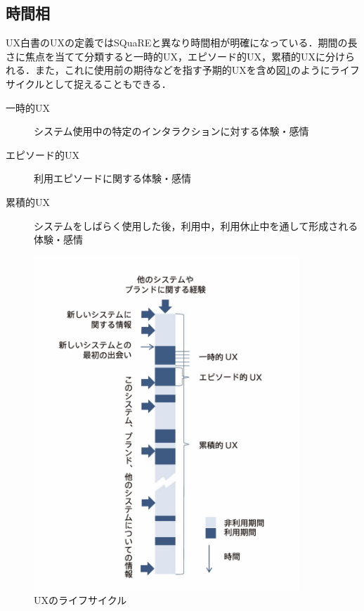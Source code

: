 \subsection{時間相}

UX白書のUXの定義ではSQuaREと異なり時間相が明確になっている．期間の長さに焦点を当てて分類すると一時的UX，エピソード的UX，累積的UXに分けられる．また，これに使用前の期待などを指す予期的UXを含め図\ref{fig:lifecycle}のようにライフサイクルとして捉えることもできる\cite{uxwhitepaper}．

\begin{description}
   \item[一時的UX]システム使用中の特定のインタラクションに対する体験・感情
   \item[エピソード的UX]利用エピソードに関する体験・感情
   \item[累積的UX]システムをしばらく使用した後，利用中，利用休止中を通して形成される体験・感情
\end{description}

\begin{figure}[htbp]
  \begin{minipage}{\hsize}
    \begin{center}
       \includegraphics[width=100mm]{img/lifecycle.png}
    \end{center}
    \caption{UXのライフサイクル\cite{uxwhitepaper}}
    \label{fig:lifecycle}
  \end{minipage}
\end{figure}

